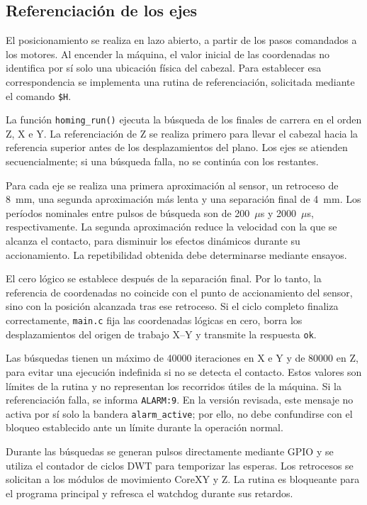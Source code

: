 \documentclass[blue,fullpaper]{ludusofficial}  %
\begin{document}
\subsection{Referenciación de los ejes}

El posicionamiento se realiza en lazo abierto, a partir
de los pasos comandados a los motores. Al encender
la máquina, el valor inicial de las coordenadas
no identifica por sí solo una ubicación física del
cabezal. Para establecer esa correspondencia se
implementa una rutina de referenciación, solicitada
mediante el comando \texttt{\$H}.

La función \texttt{homing\_run()} ejecuta la búsqueda
de los finales de carrera en el orden Z, X e Y.
La referenciación de Z se realiza primero para
llevar el cabezal hacia la referencia superior
antes de los desplazamientos del plano.
Los ejes se atienden secuencialmente; si una búsqueda
falla, no se continúa con los restantes.

Para cada eje se realiza una primera aproximación
al sensor, un retroceso de 8~mm, una segunda
aproximación más lenta y una separación final
de 4~mm. Los períodos nominales entre pulsos
de búsqueda son de 200~$\mu$s y 2000~$\mu$s,
respectivamente. La segunda aproximación reduce
la velocidad con la que se alcanza el contacto,
para disminuir los efectos dinámicos durante
su accionamiento. La repetibilidad obtenida
debe determinarse mediante ensayos.

El cero lógico se establece después de la separación
final. Por lo tanto, la referencia de coordenadas
no coincide con el punto de accionamiento del sensor,
sino con la posición alcanzada tras ese retroceso.
Si el ciclo completo finaliza correctamente,
\texttt{main.c} fija las coordenadas lógicas en cero,
borra los desplazamientos del origen de trabajo X--Y
y transmite la respuesta \texttt{ok}.

Las búsquedas tienen un máximo de 40000 iteraciones
en X e Y y de 80000 en Z, para evitar una ejecución
indefinida si no se detecta el contacto. Estos valores
son límites de la rutina y no representan los recorridos
útiles de la máquina. Si la referenciación falla,
se informa \texttt{ALARM:9}. En la versión revisada,
este mensaje no activa por sí solo la bandera
\texttt{alarm\_active}; por ello, no debe confundirse
con el bloqueo establecido ante un límite durante
la operación normal.

Durante las búsquedas se generan pulsos directamente
mediante GPIO y se utiliza el contador de ciclos DWT
para temporizar las esperas. Los retrocesos se solicitan
a los módulos de movimiento CoreXY y Z. La rutina
es bloqueante para el programa principal y refresca
el watchdog durante sus retardos.
\end{document}

